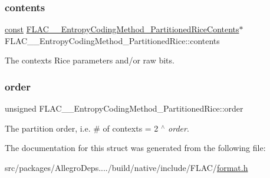 \subsubsection{\texorpdfstring{contents}{contents}}
{\footnotesize\ttfamily \hyperlink{zconf_8h_a2c212835823e3c54a8ab6d95c652660e}{const} \hyperlink{struct_f_l_a_c_____entropy_coding_method___partitioned_rice_contents}{F\+L\+A\+C\+\_\+\+\_\+\+Entropy\+Coding\+Method\+\_\+\+Partitioned\+Rice\+Contents}$\ast$ F\+L\+A\+C\+\_\+\+\_\+\+Entropy\+Coding\+Method\+\_\+\+Partitioned\+Rice\+::contents}

The context\textquotesingle{}s Rice parameters and/or raw bits. \mbox{\label{struct_f_l_a_c_____entropy_coding_method___partitioned_rice_a1e1c9049e31eab5113c245164b2c694a}} 
\subsubsection{\texorpdfstring{order}{order}}
{\footnotesize\ttfamily unsigned F\+L\+A\+C\+\_\+\+\_\+\+Entropy\+Coding\+Method\+\_\+\+Partitioned\+Rice\+::order}

The partition order, i.\+e. \# of contexts = 2 $^\wedge$ {\itshape order}. 

The documentation for this struct was generated from the following file\+:\begin{DoxyCompactItemize}
\item 
src/packages/\+Allegro\+Deps..../build/native/include/\+F\+L\+A\+C/\hyperlink{format_8h}{format.\+h}\end{DoxyCompactItemize}
